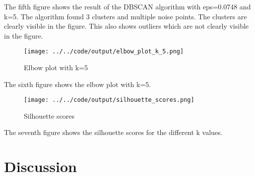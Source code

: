 \documentclass[twoside, a4paper, fleqn, reqno]{article}
\begin{document}
The fifth figure shows the result of the DBSCAN algorithm with eps=0.0748 and k=5.
The algorithm found 3 clusters and multiple noise points.
The clusters are clearly visible in the figure.
This also shows outliers which are not clearly visible in the figure.

\begin {figure}[H]
	\centering
	\texttt{[image: ../../code/output/elbow\_plot\_k\_5.png]}
	\caption{Elbow plot with k=5}
	\label{fig:elbow_plot_k_5}
\end {figure}

The sixth figure shows the elbow plot with k=5.

\begin {figure}[H]
	\centering
	\texttt{[image: ../../code/output/silhouette\_scores.png]}
	\caption{Silhouette scores}
	\label{fig:silhouette_scores}
\end {figure}

The seventh figure shows the silhouette scores for the different k values.

\section{Discussion}
\end{document}
